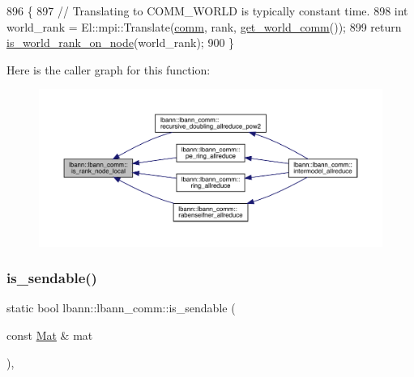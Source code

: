 \begin{DoxyCode}
896                                                                 \{
897     \textcolor{comment}{// Translating to COMM\_WORLD is typically constant time.}
898     \textcolor{keywordtype}{int} world\_rank = El::mpi::Translate(\hyperlink{file__io_8cpp_ab048c6f9fcbcfaa57ce68b00263dbebe}{comm}, rank, \hyperlink{classlbann_1_1lbann__comm_a0493f1f0c42b95674daacf5288fdb073}{get\_world\_comm}());
899     \textcolor{keywordflow}{return} \hyperlink{classlbann_1_1lbann__comm_a17ef6771432c3e91cd7d404d182ed531}{is\_world\_rank\_on\_node}(world\_rank);
900   \}
\end{DoxyCode}
Here is the caller graph for this function\+:\nopagebreak
\begin{figure}[H]
\begin{center}
\leavevmode
\includegraphics[width=350pt]{classlbann_1_1lbann__comm_a5cdd318d1505ba0f31bf4fe9fadffacc_icgraph}
\end{center}
\end{figure}
\mbox{\label{classlbann_1_1lbann__comm_a4ba1b9a6b4eb986a348d85c2d80ca3eb}} 
\subsubsection{\texorpdfstring{is\+\_\+sendable()}{is\_sendable()}\hspace{0.1cm}{\footnotesize\ttfamily [1/2]}}
{\footnotesize\ttfamily static bool lbann\+::lbann\+\_\+comm\+::is\+\_\+sendable (\begin{DoxyParamCaption}\item[{const \hyperlink{base_8hpp_a68f11fdc31b62516cb310831bbe54d73}{Mat} \&}]{mat }\end{DoxyParamCaption})\hspace{0.3cm}{\ttfamily [inline]}, {\ttfamily [static]}}

